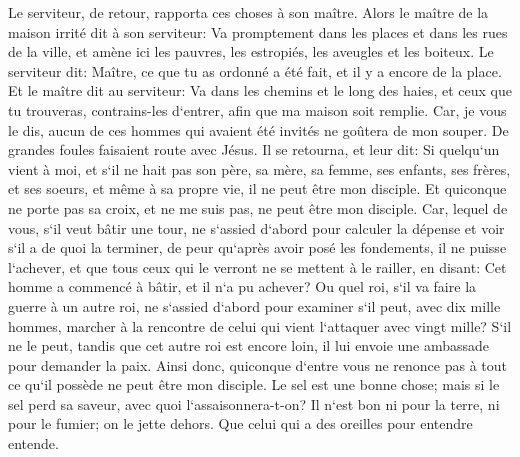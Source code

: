 \verse Le serviteur, de retour, rapporta ces choses à son maître. Alors le maître de la maison irrité dit à son serviteur: Va promptement dans les places et dans les rues de la ville, et amène ici les pauvres, les estropiés, les aveugles et les boiteux. 
\verse Le serviteur dit: Maître, ce que tu as ordonné a été fait, et il y a encore de la place. 
\verse Et le maître dit au serviteur: Va dans les chemins et le long des haies, et ceux que tu trouveras, contrains-les d`entrer, afin que ma maison soit remplie. 
\verse Car, je vous le dis, aucun de ces hommes qui avaient été invités ne goûtera de mon souper. 
\verse De grandes foules faisaient route avec Jésus. Il se retourna, et leur dit: 
\verse Si quelqu`un vient à moi, et s`il ne hait pas son père, sa mère, sa femme, ses enfants, ses frères, et ses soeurs, et même à sa propre vie, il ne peut être mon disciple. 
\verse Et quiconque ne porte pas sa croix, et ne me suis pas, ne peut être mon disciple. 
\verse Car, lequel de vous, s`il veut bâtir une tour, ne s`assied d`abord pour calculer la dépense et voir s`il a de quoi la terminer, 
\verse de peur qu`après avoir posé les fondements, il ne puisse l`achever, et que tous ceux qui le verront ne se mettent à le railler, 
\verse en disant: Cet homme a commencé à bâtir, et il n`a pu achever? 
\verse Ou quel roi, s`il va faire la guerre à un autre roi, ne s`assied d`abord pour examiner s`il peut, avec dix mille hommes, marcher à la rencontre de celui qui vient l`attaquer avec vingt mille? 
\verse S`il ne le peut, tandis que cet autre roi est encore loin, il lui envoie une ambassade pour demander la paix. 
\verse Ainsi donc, quiconque d`entre vous ne renonce pas à tout ce qu`il possède ne peut être mon disciple. 
\verse Le sel est une bonne chose; mais si le sel perd sa saveur, avec quoi l`assaisonnera-t-on? 
\verse Il n`est bon ni pour la terre, ni pour le fumier; on le jette dehors. Que celui qui a des oreilles pour entendre entende. 

\chapter{}

